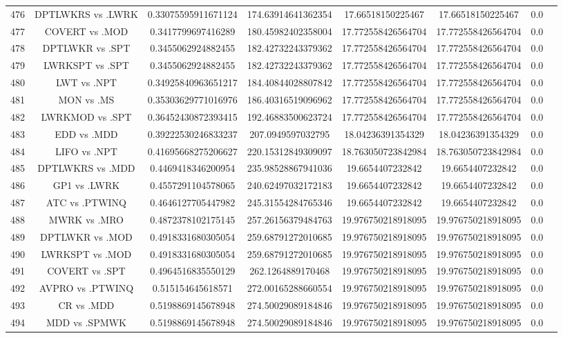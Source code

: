 \documentclass[a3paper,10pt]{article}
\begin{document}
\begin{table}[!htp]
\begin{tabular}{cccccccc}
476&DPTLWKRS vs .LWRK&0.33075595911671124&174.63914641362354&17.66518150225467&17.66518150225467&0.0\\
477&COVERT vs .MOD&0.3417799697416289&180.45982402358004&17.772558426564704&17.772558426564704&0.0\\
478&DPTLWKR vs .SPT&0.3455062924882455&182.42732243379362&17.772558426564704&17.772558426564704&0.0\\
479&LWRKSPT vs .SPT&0.3455062924882455&182.42732243379362&17.772558426564704&17.772558426564704&0.0\\
480&LWT vs .NPT&0.34925840963651217&184.40844028807842&17.772558426564704&17.772558426564704&0.0\\
481&MON vs .MS&0.35303629771016976&186.40316519096962&17.772558426564704&17.772558426564704&0.0\\
482&LWRKMOD vs .SPT&0.36452430872393415&192.46883500623724&17.772558426564704&17.772558426564704&0.0\\
483&EDD vs .MDD&0.39222530246833237&207.0949597032795&18.04236391354329&18.04236391354329&0.0\\
484&LIFO vs .NPT&0.41695668275206627&220.15312849309097&18.763050723842984&18.763050723842984&0.0\\
485&DPTLWKRS vs .MDD&0.4469418346200954&235.98528867941036&19.6654407232842&19.6654407232842&0.0\\
486&GP1 vs .LWRK&0.4557291104578065&240.62497032172183&19.6654407232842&19.6654407232842&0.0\\
487&ATC vs .PTWINQ&0.4646127705447982&245.31554284765346&19.6654407232842&19.6654407232842&0.0\\
488&MWRK vs .MRO&0.4872378102175145&257.26156379484763&19.976750218918095&19.976750218918095&0.0\\
489&DPTLWKR vs .MOD&0.4918331680305054&259.68791272010685&19.976750218918095&19.976750218918095&0.0\\
490&LWRKSPT vs .MOD&0.4918331680305054&259.68791272010685&19.976750218918095&19.976750218918095&0.0\\
491&COVERT vs .SPT&0.4964516835550129&262.1264889170468&19.976750218918095&19.976750218918095&0.0\\
492&AVPRO vs .PTWINQ&0.515154645618571&272.00165288660554&19.976750218918095&19.976750218918095&0.0\\
493&CR vs .MDD&0.5198869145678948&274.50029089184846&19.976750218918095&19.976750218918095&0.0\\
494&MDD vs .SPMWK&0.5198869145678948&274.50029089184846&19.976750218918095&19.976750218918095&0.0\\

\end{tabular}
\end{table}
\end{document}
